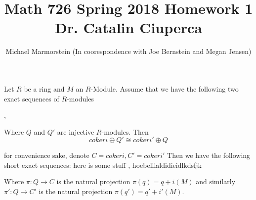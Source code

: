 \documentclass{article}
\title{Math 726 Spring 2018 Homework 1 Dr. Catalin Ciuperca}
\author{Michael Marmorstein \vspace{0.2pt} (In coorespondence with Joe Bernstein and Megan Jensen)}
\begin{document}
\maketitle

\newline
Let $R$ be a ring and $M$ an $R$-Module.  Assume that we have the following two exact sequences of $R$-modules
\newline
\begin{center}
\newline
{},
\newline
\end{center}
Where $Q$ and $Q'$ are injective $R$-modules.
Then 
$$coker i \oplus Q' \cong coker i' \oplus Q $$

\proof
for convenience sake, denote $C= coker i, C' = coker i'$ 
\newline
Then we have the following short exact sequences:
here is some stuff , hoebelllaldidieidlkdsfjk
\newline
{}
\newline
{}
\newline
Where $\pi:Q \rightarrow C$ is the natural projection $\pi(q) = q + i(M)$
and similarly $\pi':Q \rightarrow C'$ is the natural projection $\pi(q') = q' + i'(M)$.
\end{document}
